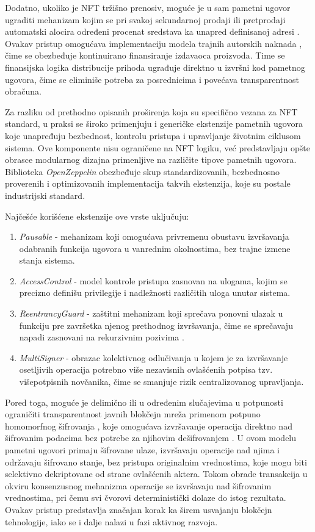 Dodatno, ukoliko je NFT tržišno prenosiv, moguće je u sam pametni ugovor ugraditi mehanizam kojim se pri svakoj sekundarnoj prodaji ili pretprodaji automatski alocira određeni procenat sredstava ka unapred definisanoj adresi \cite{MARKETeip2981}. Ovakav pristup omogućava implementaciju modela trajnih autorskih naknada , čime se obezbeđuje kontinuirano finansiranje izdavaoca proizvoda. Time se finansijska logika distribucije prihoda ugrađuje direktno u izvršni kod pametnog ugovora, čime se eliminiše potreba za posrednicima i povećava transparentnost obračuna.

Za razliku od prethodno opisanih proširenja koja su specifično vezana za NFT standard, u praksi se široko primenjuju i generičke ekstenzije pametnih ugovora koje unapređuju bezbednost, kontrolu pristupa i upravljanje životnim ciklusom sistema. Ove komponente nisu ograničene na NFT logiku, već predstavljaju opšte obrasce modularnog dizajna primenljive na različite tipove pametnih ugovora. Biblioteka \textit{OpenZeppelin} obezbeđuje skup standardizovanih, bezbednosno proverenih i optimizovanih implementacija takvih ekstenzija, koje su postale industrijski standard.

Najčešće korišćene ekstenzije ove vrste uključuju:
\begin{enumerate}
\item \textit{Pausable} - mehanizam koji omogućava privremenu obustavu izvršavanja odabranih funkcija ugovora u vanrednim okolnostima, bez trajne izmene stanja sistema.
\item \textit{AccessControl} - model kontrole pristupa zasnovan na ulogama, kojim se precizno definišu privilegije i nadležnosti različitih uloga unutar sistema.
\item \textit{ReentrancyGuard} - zaštitni mehanizam koji sprečava ponovni ulazak u funkciju pre završetka njenog prethodnog izvršavanja, čime se sprečavaju napadi zasnovani na rekurzivnim pozivima \cite{samreen2020reentrancy}.
\item \textit{MultiSigner} - obrazac kolektivnog odlučivanja u kojem je za izvršavanje osetljivih operacija potrebno više nezavisnih ovlašćenih potpisa tzv. višepotpisnih novčanika, čime se smanjuje rizik centralizovanog upravljanja.
\end{enumerate}

Pored toga, moguće je delimično ili u određenim slučajevima u potpunosti ograničiti transparentnost javnih blokčejn mreža primenom potpuno homomorfnog šifrovanja , koje omogućava izvršavanje operacija direktno nad šifrovanim podacima bez potrebe za njihovim dešifrovanjem \cite{fhevm}. U ovom modelu pametni ugovori primaju šifrovane ulaze, izvršavaju operacije nad njima i održavaju šifrovano stanje, bez pristupa originalnim vrednostima, koje mogu biti selektivno dekriptovane od strane ovlašćenih aktera. Tokom obrade transakcija u okviru konsenzusnog mehanizma operacije se izvršavaju nad šifrovanim vrednostima, pri čemu svi čvorovi deterministički dolaze do istog rezultata. Ovakav pristup predstavlja značajan korak ka širem usvajanju blokčejn tehnologije, iako se i dalje nalazi u fazi aktivnog razvoja.


